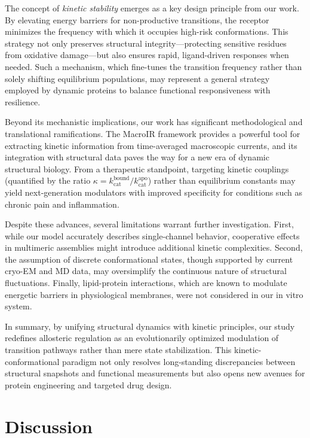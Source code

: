 \documentclass[pdflatex,sn-mathphys-num]{sn-jnl}%
\theoremstyle{thmstyleone}%
\theoremstyle{thmstyletwo}%
\theoremstyle{thmstylethree}%
\begin{document}
The concept of \textit{kinetic stability} emerges as a key design principle from our work. By elevating energy barriers for non-productive transitions, the receptor minimizes the frequency with which it occupies high-risk conformations. This strategy not only preserves structural integrity—protecting sensitive residues from oxidative damage—but also ensures rapid, ligand-driven responses when needed. Such a mechanism, which fine-tunes the transition frequency rather than solely shifting equilibrium populations, may represent a general strategy employed by dynamic proteins to balance functional responsiveness with resilience.

Beyond its mechanistic implications, our work has significant methodological and translational ramifications. The MacroIR framework provides a powerful tool for extracting kinetic information from time-averaged macroscopic currents, and its integration with structural data paves the way for a new era of dynamic structural biology. From a therapeutic standpoint, targeting kinetic couplings (quantified by the ratio $\kappa = k_{\text{cat}}^{\text{bound}}/k_{\text{cat}}^{\text{apo}}$) rather than equilibrium constants may yield next-generation modulators with improved specificity for conditions such as chronic pain and inflammation.

Despite these advances, several limitations warrant further investigation. First, while our model accurately describes single-channel behavior, cooperative effects in multimeric assemblies might introduce additional kinetic complexities. Second, the assumption of discrete conformational states, though supported by current cryo-EM and MD data, may oversimplify the continuous nature of structural fluctuations. Finally, lipid-protein interactions, which are known to modulate energetic barriers in physiological membranes, were not considered in our in vitro system.

In summary, by unifying structural dynamics with kinetic principles, our study redefines allosteric regulation as an evolutionarily optimized modulation of transition pathways rather than mere state stabilization. This kinetic-conformational paradigm not only resolves long-standing discrepancies between structural snapshots and functional measurements but also opens new avenues for protein engineering and targeted drug design.

\section{Discussion}
\end{document}
